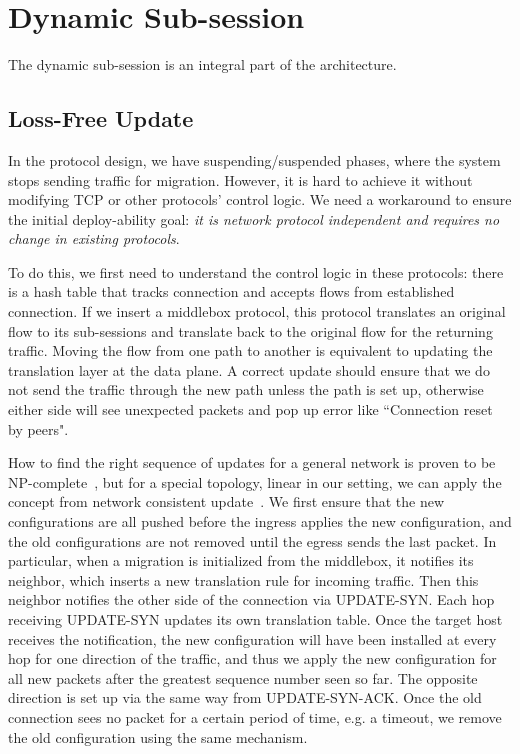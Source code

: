 \section{Dynamic Sub-session}

The dynamic sub-session is an integral part of the architecture. 

\subsection{Loss-Free Update}

In the protocol design, we have suspending/suspended phases, where the system stops sending traffic for migration. However, it is hard to achieve it without modifying TCP or other protocols' control logic. We need a workaround to ensure the initial deploy-ability goal: \textit{it is network protocol independent and requires no change in existing protocols}. 

To do this, we first need to understand the control logic in these protocols: there is a hash table that tracks connection and accepts flows from established connection. If we insert a middlebox protocol, this protocol translates an original flow to its sub-sessions and translate back to the original flow for the returning traffic. Moving the flow from one path to another is equivalent to updating the translation layer at the data plane. A correct update should ensure that we do not send the traffic through the new path unless the path is set up, otherwise either side will see unexpected packets and pop up error like ``\textsf{Connection reset by peers}". 

How to find the right sequence of updates for a general network is proven to be NP-complete~\cite{SWAN, zUpdate}, but for a special topology, linear in our setting, we can apply the concept from network consistent update~\cite{consistentupdate, ratul}. We first ensure that the new configurations are all pushed before the ingress applies the new configuration, and the old configurations are not removed until the egress sends the last packet. In particular, when a migration is initialized from the middlebox, it notifies its neighbor, which inserts a new translation rule for incoming traffic. Then this neighbor notifies the other side of the connection via UPDATE-SYN. Each hop receiving UPDATE-SYN updates its own translation table. Once the target host receives the notification, the new configuration will have been installed at every hop for one direction of the traffic, and thus we apply the new configuration for all new packets after the greatest sequence number seen so far. The opposite direction is set up via the same way from UPDATE-SYN-ACK. Once the old connection sees no packet for a certain period of time, e.g. a timeout, we remove the old configuration using the same mechanism. 

